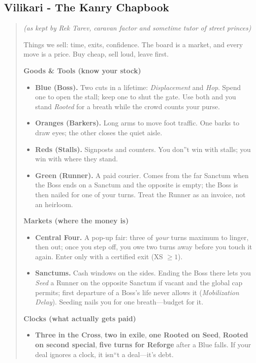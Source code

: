 \documentclass[11pt]{article}
\begin{document}
\subsection{Vilikari - The Kanry Chapbook}
\begin{quote}\small\itshape
(as kept by Rek Tarev, caravan factor and sometime tutor of street princes)

Things we sell: time, exits, confidence. The board is a market, and every move is a price. Buy cheap, sell loud, leave first.

\medskip
\textbf{Goods \& Tools (know your stock)}
\begin{itemize}\itemsep0.2em
  \item \textbf{Blue (Boss).} Two cuts in a lifetime: \emph{Displacement} and \emph{Hop}. Spend one to open the stall; keep one to shut the gate. Use both and you stand \emph{Rooted} for a breath while the crowd counts your purse.
  \item \textbf{Oranges (Barkers).} Long arms to move foot traffic. One barks to draw eyes; the other closes the quiet aisle.
  \item \textbf{Reds (Stalls).} Signposts and counters. You don''t win with stalls; you win with where they stand.
  \item \textbf{Green (Runner).} A paid courier. Comes from the far Sanctum when the Boss ends on a Sanctum and the opposite is empty; the Boss is then nailed for one of your turns. Treat the Runner as an invoice, not an heirloom.
\end{itemize}

\textbf{Markets (where the money is)}
\begin{itemize}\itemsep0.2em
  \item \textbf{Central Four.} A pop-up fair: three of \emph{your} turns maximum to linger, then out; once you step off, you owe two turns away before you touch it again. Enter only with a certified exit (XS $\ge 1$).
  \item \textbf{Sanctums.} Cash windows on the sides. Ending the Boss there lets you \emph{Seed} a Runner on the opposite Sanctum if vacant and the global cap permits; first departure of a Boss's life never allows it (\emph{Mobilization Delay}). Seeding nails you for one breath---budget for it.
\end{itemize}

\textbf{Clocks (what actually gets paid)}
\begin{itemize}\itemsep0.2em
  \item \textbf{Three in the Cross}, \textbf{two in exile}, \textbf{one Rooted on Seed}, \textbf{Rooted on second special}, \textbf{five turns for Reforge} after a Blue falls. If your deal ignores a clock, it isn``t a deal---it's debt.
\end{itemize}


\end{quote}
\end{document}
